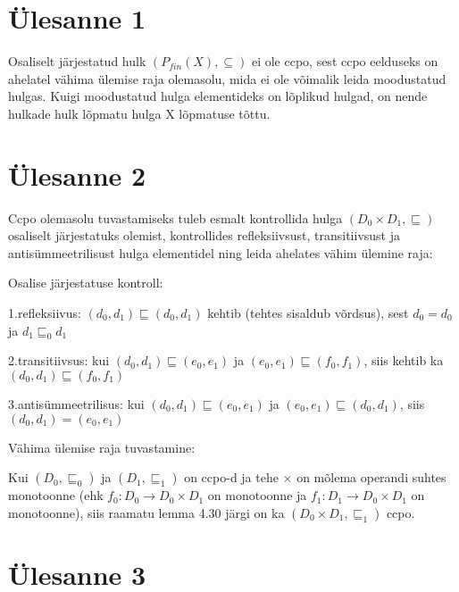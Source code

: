 \section{Ülesanne 1}

Osaliselt järjestatud hulk \( (P_{fin}(X), \subseteq) \) ei ole ccpo, sest ccpo
eelduseks on ahelatel vähima ülemise raja olemasolu, mida ei ole võimalik leida
moodustatud hulgas. Kuigi moodustatud hulga elementideks on lõplikud hulgad, on
nende hulkade hulk lõpmatu hulga X lõpmatuse tõttu.

\section{Ülesanne 2}

Ccpo olemasolu tuvastamiseks tuleb esmalt kontrollida hulga \((D_0 \times D_1,
\sqsubseteq )\) osaliselt järjestatuks olemist, kontrollides refleksiivsust,
transitiivsust ja antisümmeetrilisust hulga elementidel ning leida ahelates
vähim ülemine raja:

Osalise järjestatuse kontroll:

1.refleksiivus: \((d_0, d_1) \sqsubseteq (d_0, d_1)\) kehtib (tehtes sisaldub
võrdsus), sest \(d_0 = d_0\) ja \(d_1 \sqsubseteq_0 d_1 \)

2.transitiivsus: kui \((d_0, d_1) \sqsubseteq (e_0, e_1)\) ja \((e_0, e_1)
\sqsubseteq (f_0, f_1)\), siis kehtib ka \((d_0, d_1) \sqsubseteq (f_0, f_1)\)

3.antisümmeetrilisus: kui \((d_0, d_1) \sqsubseteq (e_0, e_1)\) ja \((e_0, e_1)
\sqsubseteq (d_0, d_1)\), siis \((d_0, d_1) = (e_0, e_1)\)

Vähima ülemise raja tuvastamine:

Kui \((D_0, \sqsubseteq_0)\) ja \((D_1, \sqsubseteq_1)\) on ccpo-d ja tehe
\(\times\) on mõlema operandi suhtes monotoonne (ehk \(f_0:D_0 \rightarrow D_0
\times D_1\) on monotoonne ja \(f_1:D_1 \rightarrow D_0 \times D_1\) on
monotoonne), siis raamatu lemma 4.30 järgi on ka \((D_0 \times D_1,
\sqsubseteq_1)\) ccpo.

\section{Ülesanne 3}









